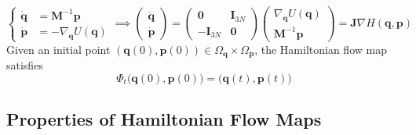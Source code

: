 \documentclass{article}
\begin{document}
    \begin{equation}
      \begin{cases} \boldsymbol{\dot{q}} & = \mathbf{M}^{-1} \mathbf{p} \\
      \boldsymbol{\dot{p}} & = - \nabla_\mathbf{q} U(\mathbf{q}) \end{cases} \implies \begin{pmatrix} \boldsymbol{\dot{q}} \\ \boldsymbol{\dot{p}} \end{pmatrix} = \begin{pmatrix} \mathbf{0} & \mathbf{I}_{3N} \\ -\mathbf{I}_{3N} & \mathbf{0} \end{pmatrix} \begin{pmatrix} \nabla_\mathbf{q} U (\mathbf{q})\\ \mathbf{M}^{-1} \mathbf{p} \end{pmatrix} = \mathbf{J} \nabla H(\mathbf{q}, \mathbf{p})
    \end{equation}
    Given an initial point $(\mathbf{q}(0), \mathbf{p}(0)) \in \Omega_{\mathbf{q}} \times \Omega_{\mathbf{p}}$, the Hamiltonian flow map satisfies 
    \begin{equation}
      \Phi_t \big( \mathbf{q}(0), \mathbf{p}(0) \big) = \big(\mathbf{q}(t), \mathbf{p}(t)\big)
    \end{equation}

  \subsection{Properties of Hamiltonian Flow Maps}
\end{document}
